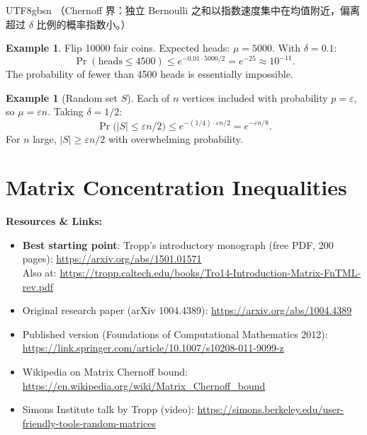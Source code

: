 \documentclass[12pt]{article}
\theoremstyle{definition}
\newtheorem{example}[theorem]{Example}
\theoremstyle{remark}
\newcommand{\resources}[1]{%
  \vspace{4pt}
  \noindent\colorbox{blue!8}{\parbox{\dimexpr\linewidth-2\fboxsep}{%
    \small\textbf{Resources \& Links:} #1}}
  \vspace{4pt}
}
\begin{document}
\begin{CJK}{UTF8}{gbsn}
（Chernoff 界：独立 Bernoulli 之和以指数速度集中在均值附近，偏离超过 $\delta$ 比例的概率指数小。）
\end{CJK}

\begin{example}
Flip 10000 fair coins.  Expected heads: $\mu = 5000$.  With $\delta = 0.1$:
\[
  \Pr(\text{heads} \le 4500) \le e^{-0.01 \cdot 5000/2} = e^{-25} \approx 10^{-11}.
\]
The probability of fewer than 4500 heads is essentially impossible.
\end{example}

\begin{example}[Random set $S$]
Each of $n$ vertices included with probability $p = \varepsilon$, so $\mu = \varepsilon n$.
Taking $\delta = 1/2$:
\[
  \Pr\!\bigl(|S| \le \varepsilon n/2\bigr) \le e^{-(1/4)\cdot\varepsilon n/2} = e^{-\varepsilon n/8}.
\]
For $n$ large, $|S| \ge \varepsilon n/2$ with overwhelming probability.
\end{example}

\section{Matrix Concentration Inequalities}

\resources{
\begin{itemize}\setlength\itemsep{0pt}
  \item \textbf{Best starting point}: Tropp's introductory monograph (free PDF, 200 pages):
        \url{https://arxiv.org/abs/1501.01571}\\
        Also at: \url{https://tropp.caltech.edu/books/Tro14-Introduction-Matrix-FnTML-rev.pdf}
  \item Original research paper (arXiv 1004.4389):
        \url{https://arxiv.org/abs/1004.4389}
  \item Published version (Foundations of Computational Mathematics 2012):
        \url{https://link.springer.com/article/10.1007/s10208-011-9099-z}
  \item Wikipedia on Matrix Chernoff bound:
        \url{https://en.wikipedia.org/wiki/Matrix_Chernoff_bound}
  \item Simons Institute talk by Tropp (video):
        \url{https://simons.berkeley.edu/user-friendly-tools-random-matrices}
\end{itemize}
}
\end{document}
